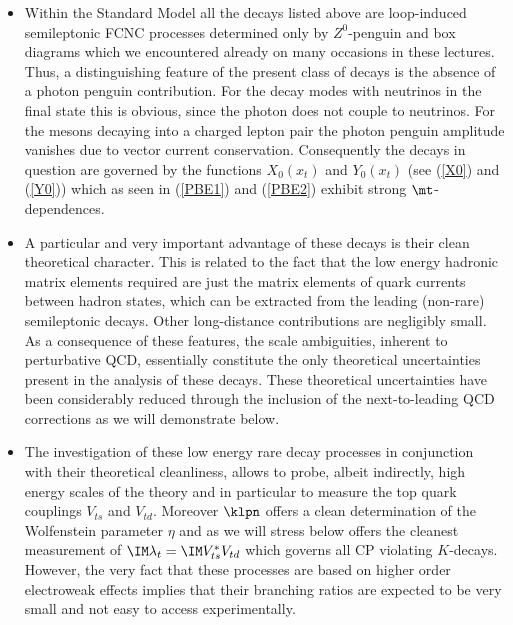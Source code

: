 \begin{itemize}
\item
Within the Standard Model all the decays listed above are loop-induced
semileptonic FCNC processes determined only 
by $Z^0$-penguin and box diagrams which we encountered already
on many occasions in these lectures.
Thus, a distinguishing feature of the present class of decays
is the absence of a photon penguin contribution. For the decay modes
with neutrinos in the final state this is obvious, since the photon
does not couple to neutrinos. For the mesons decaying into a charged
lepton pair the photon penguin amplitude vanishes due to vector current
conservation. Consequently the decays in question are governed by the
functions $X_0(x_t)$ and $Y_0(x_t)$ (see (\ref{X0}) and (\ref{Y0}))
which as seen in (\ref{PBE1}) and (\ref{PBE2}) exhibit strong 
$\mt$-dependences.
\item
A particular and very important advantage of these decays
is their clean theoretical character.
This is related to the fact that
the low energy hadronic
matrix elements required are just the matrix elements of quark currents
between hadron states, which can be extracted from the leading
(non-rare) semileptonic decays. Other long-distance contributions
are negligibly small. As a consequence of these features,
the scale ambiguities, inherent to perturbative QCD, essentially
constitute  the only theoretical uncertainties 
present in the analysis of these decays.
These theoretical uncertainties have been considerably reduced
through the inclusion of
the next-to-leading QCD corrections 
 \cite{BB1,BB2,BB3} as we will demonstrate below. 
\item
The investigation of these low energy rare decay processes in
conjunction with their theoretical cleanliness, allows to probe,
albeit indirectly, high energy scales of the theory and in particular
to measure the top quark couplings $V_{ts}$ and $V_{td}$.
Moreover $\klpn$  offers
a clean determination of the Wolfenstein parameter $\eta$ and 
as we will stress below offers the cleanest measurement
of $\IM\lambda_t= \IM V^*_{ts} V_{td}$ which governs all  
CP violating  $K$-decays. 
However, the very fact
that these processes are based on higher order electroweak effects
implies
that their branching ratios are expected to be very small and not easy to
access experimentally.
\end{itemize}

